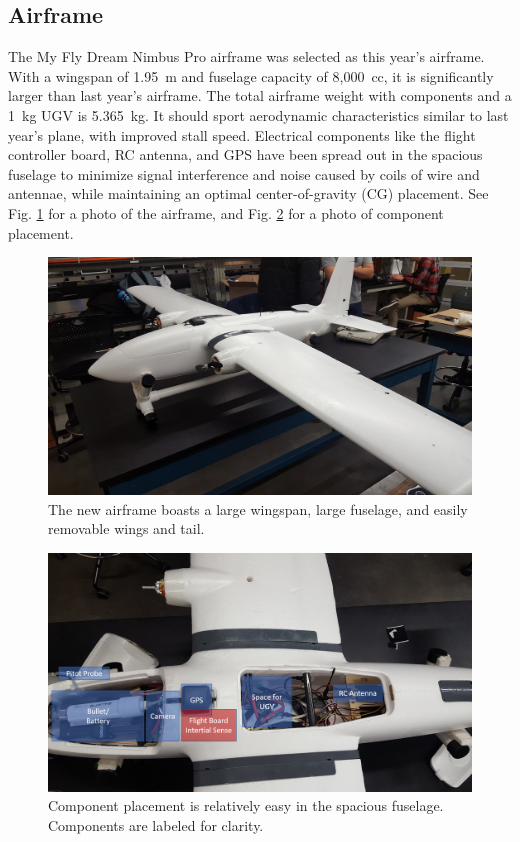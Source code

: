 \documentclass[]{auvsi_doc}
\begin{document}
\subsection{Airframe}
The My Fly Dream Nimbus Pro airframe was selected as this year's airframe. With a wingspan of 1.95~m and fuselage capacity of 8,000~cc, it is significantly larger than last year's airframe. The total airframe weight with components and a 1~kg UGV is 5.365~kg. It should sport aerodynamic characteristics similar to last year's plane, with improved stall speed. Electrical components like the flight controller board, RC antenna, and GPS have been spread out in the spacious fuselage to minimize signal interference and noise caused by coils of wire and antennae, while maintaining an optimal center-of-gravity (CG) placement. See Fig. \ref{airframe} for a photo of the airframe, and Fig. \ref{components} for a photo of component placement.
\begin{figure}[h!]
	\includegraphics[scale=0.6]{figs/airframe.jpg}
	\centering
	\caption{The new airframe boasts a large wingspan, large fuselage, and easily removable wings and tail.}
	\label{airframe}
\end{figure}
\begin{figure}[h!]
	\includegraphics[scale=0.4]{figs/ComponentPlacement.png}
	\centering
	\caption{Component placement is relatively easy in the spacious fuselage. Components are labeled for clarity.}
	\label{components}
\end{figure}
\end{document}
